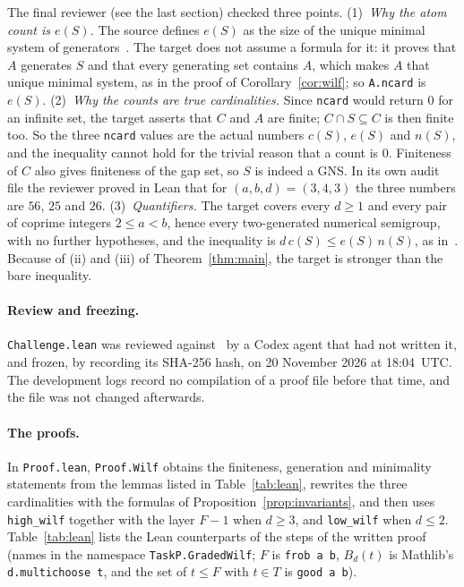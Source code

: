 \documentclass[11pt]{article}
\theoremstyle{definition}
\theoremstyle{remark}
\newcommand{\Bd}[2]{B_{#1}(#2)}
\begin{document}
{The final reviewer (see the last section) checked three points.
(1)~\emph{Why the atom count is $e(S)$.} The source defines $e(S)$ as the size of
the unique minimal system of generators~\cite[§2]{cn}. The target does not
assume a formula for it: it proves that $A$ generates $S$ and that every
generating set contains $A$, which makes $A$ that unique minimal system, as in
the proof of Corollary~\ref{cor:wilf}; so \texttt{A.ncard} is $e(S)$.
(2)~\emph{Why the counts are true cardinalities.} Since \texttt{ncard} would
return $0$ for an infinite set, the target asserts that $C$ and $A$ are finite;
$C\cap S\subseteq C$ is then finite too. So the three \texttt{ncard} values are
the actual numbers $c(S)$, $e(S)$ and $n(S)$, and the inequality cannot hold
for the trivial reason that a count is $0$. Finiteness of $C$ also gives
finiteness of the gap set, so $S$ is indeed a GNS. In its own audit file the
reviewer proved in Lean that for $(a,b,d)=(3,4,3)$ the three numbers are
$56$, $25$ and $26$. (3)~\emph{Quantifiers.} The target covers every $d\ge1$
and every pair of coprime integers $2\le a<b$, hence every two-generated
numerical semigroup, with no further hypotheses, and the inequality is
$d\,c(S)\le e(S)\,n(S)$, as in~\cite{cdffpu}. Because of (ii) and (iii) of
Theorem~\ref{thm:main}, the target is stronger than the bare inequality.

\paragraph{Review and freezing.}
\texttt{Challenge.lean} was reviewed against~\cite{cn} by a Codex agent that had
not written it, and frozen, by recording its SHA-256 hash, on 20 November 2026
at 18:04~UTC. The development logs record no compilation of a proof file before
that time, and the file was not changed afterwards.

\paragraph{The proofs.}
In \texttt{Proof.lean}, \texttt{Proof.Wilf} obtains the finiteness, generation
and minimality statements from the lemmas listed in Table~\ref{tab:lean}, rewrites
the three cardinalities with the formulas of
Proposition~\ref{prop:invariants}, and then uses \texttt{high\_\allowbreak wilf}
together with the layer $F-1$ when $d\ge3$, and
\texttt{low\_\allowbreak wilf} when $d\le2$. Table~\ref{tab:lean} lists the Lean
counterparts of the steps of the written proof (names in the namespace
\texttt{TaskP.GradedWilf}; $F$ is \texttt{frob a b}, $\Bd{d}{t}$ is Mathlib's
\texttt{d.multichoose t}, and the set of $t\le F$ with $t\in T$ is
\texttt{good a b}).

}
\end{document}
